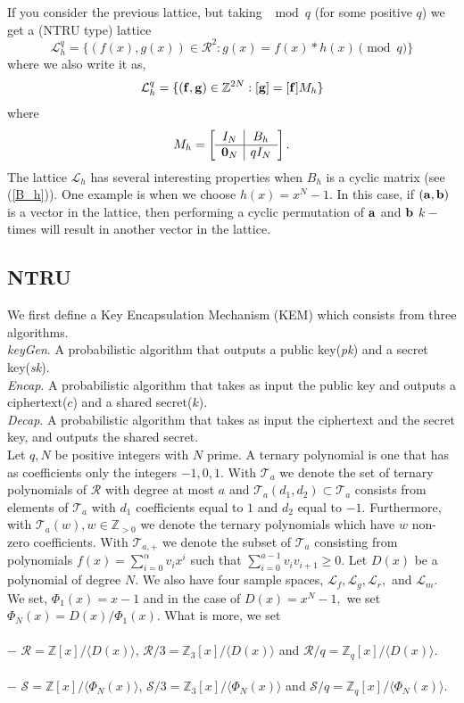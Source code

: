 \documentclass{amsart}
\numberwithin{equation}{section}
\begin{document}
If you consider the previous lattice, but taking ${\mod{q}}$ (for some positive $q$) we get a (NTRU type) lattice
$${\mathcal{L}}_h^q=\{(f(x),g(x))\in {\mathcal{R}}^2 : g(x)=f(x)*h(x)\pmod{q}\}$$ where we also write it as,
$${\mathcal{L}}_h^q=\{({\bf f},{\bf g})\in {\mathbb{Z}}^{2N} : [{\bf g}]=[{\bf f}]M_h\}$$
where 
$$	M_h=\left[\begin{array}{c|c}
			I_N & B_h  \\
			\hline
			{\bf 0}_N & qI_N   \\
		\end{array}\right].
			$$
The lattice ${\mathcal{L}}_h$ has several interesting properties when $B_h$ is a cyclic matrix (see (\ref{B_h})). One example is when we choose $h(x)=x^N-1$. In this case, if $({\bf a},{\bf b})$ is a vector in the lattice, then performing a cyclic permutation of ${\bf a}$ and ${\bf b}$ $k-$times will result in another vector in the lattice.
\subsection{NTRU}
We first define a Key Encapsulation Mechanism (KEM) which consists from three algorithms.\\
{\it{keyGen}}. A probabilistic algorithm that outputs a public key({\it{pk}}) and a secret key({\it{sk}}). \\
{\it{Encap}}. A probabilistic algorithm that takes as input the public key and outputs a ciphertext($c$) and a shared secret($k$). \\
{\it{Decap}}. A probabilistic algorithm that takes as input the ciphertext and the secret key, and outputs the shared secret.\\

Let $q,N$ be positive integers with $N$ prime. A ternary polynomial is one that has as coefficients only the integers $-1,0,1.$  With 
${\mathcal{T}}_a$ we denote the set of ternary polynomials of ${\mathcal{R}}$ with degree at most $a$ and $\mathcal{T}_a(d_1,d_2)\subset {\mathcal{T}}_{a}$ consists from elements of ${\mathcal{T}}_{a}$ with $d_1$ coefficients equal to $1$ and $d_2$ equal to $-1.$ Furthermore, with ${\mathcal{T}}_a(w), w\in{\mathbb{Z}}_{>0}$ we denote the ternary polynomials which have $w$ non-zero coefficients. With ${\mathcal{T}}_{a,+}$ we denote the subset of ${\mathcal{T}}_a$ consisting from polynomials $f(x)=\sum_{i=0}^{\alpha}v_ix^i$ such that $\sum_{i=0}^{a-1}v_iv_{i+1}\ge 0.$	Let $D(x)$ be a polynomial of degree $N.$ We also have four sample spaces,
${\mathcal{L}}_f, {\mathcal{L}}_g, {\mathcal{L}}_r,$ and ${\mathcal{L}}_m.$
We set, $\Phi_1(x)=x-1$ and in the case of $D(x)=x^N-1,$ we set $\Phi_N(x) = D(x)/\Phi_1(x).$  
What is more, we set \\\\
$-$ ${\mathcal{R}}={\mathbb{Z}}[x]/\langle D(x) 
\rangle$, ${\mathcal{R}/3}={\mathbb{Z}}_3[x]/
\langle D(x) \rangle$ and  
${\mathcal{R}}/q={\mathbb{Z}}_q[x]/\langle D(x) 
\rangle$. \\\\
$-$ ${\mathcal{S}}={\mathbb{Z}}[x]/\langle \Phi_N(x) 
\rangle$, ${\mathcal{S}/3}={\mathbb{Z}}_3[x]/\langle \Phi_N(x)  \rangle$ 
and  ${\mathcal{S}}/q={\mathbb{Z}}_q[x]/\langle \Phi_N(x) \rangle.$
\end{document}
